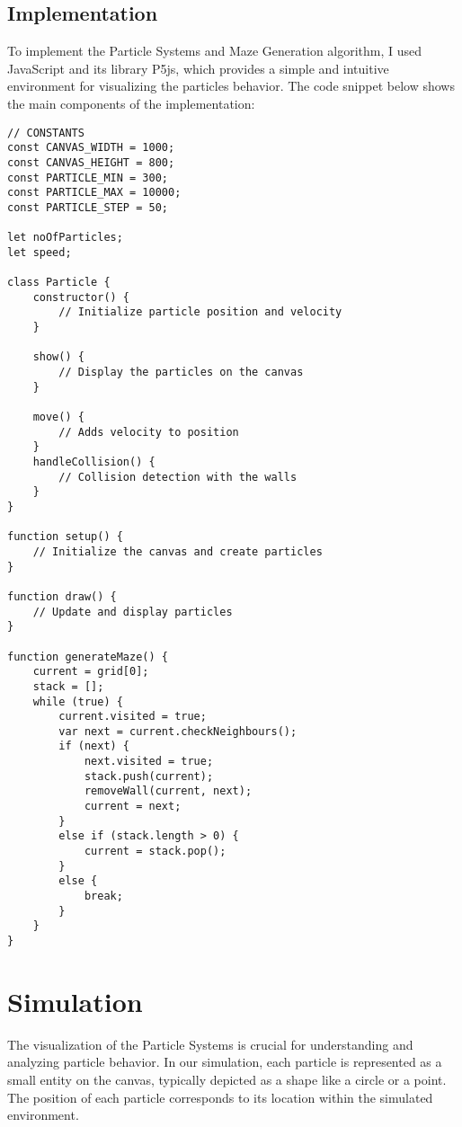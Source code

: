 \documentclass{article}
\begin{document}
\subsection{Implementation}
To implement the Particle Systems and Maze Generation algorithm, I used JavaScript and its library P5js, which provides a simple and intuitive environment for visualizing the particles behavior. The code snippet below shows the main components of the implementation:

\begin{lstlisting}[caption=Particle Systems and Maze Generation Implementation]
// CONSTANTS 
const CANVAS_WIDTH = 1000;
const CANVAS_HEIGHT = 800;
const PARTICLE_MIN = 300;
const PARTICLE_MAX = 10000;
const PARTICLE_STEP = 50;

let noOfParticles;
let speed;

class Particle {
    constructor() {
        // Initialize particle position and velocity
    }

    show() {
        // Display the particles on the canvas
    }

    move() {
        // Adds velocity to position
    }
    handleCollision() {
        // Collision detection with the walls 
    }
}

function setup() {
    // Initialize the canvas and create particles
}

function draw() {
    // Update and display particles
}

function generateMaze() {
    current = grid[0];
    stack = [];
    while (true) {
        current.visited = true;
        var next = current.checkNeighbours();
        if (next) {
            next.visited = true;
            stack.push(current);
            removeWall(current, next);
            current = next;
        }
        else if (stack.length > 0) {
            current = stack.pop();
        }
        else {
            break;
        }
    }
}
\end{lstlisting}
    

\section{Simulation}
The visualization of the Particle Systems is crucial for understanding and analyzing particle behavior. In our simulation, each particle is represented as a small entity on the canvas, typically depicted as a shape like a circle or a point. The position of each particle corresponds to its location within the simulated environment.
\end{document}
